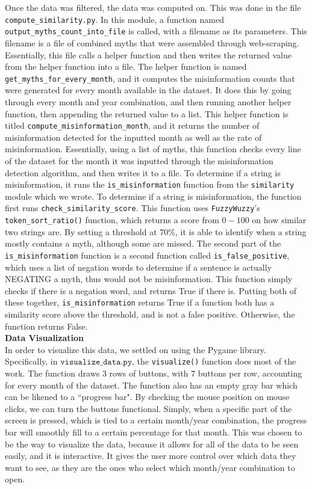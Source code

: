 \documentclass[fontsize=11pt]{article}
\begin{document}
    Once the data was filtered, the data was computed on. This was done in the file \texttt{compute\_similarity.py}. In this module, a function named \texttt{output\_myths\_count\_into\_file} is called, with a filename as its parameters. This filename is a file of combined myths that were assembled through web-scraping. Essentially, this file calls a helper function and then writes the returned value from the helper function into a file. The helper function is named \texttt{get\_myths\_for\_every\_month}, and it computes the misinformation counts that were generated for every month available in the dataset. It does this by going through every month and year combination, and then running another helper function, then appending the returned value to a list. This helper function is titled \texttt{compute\_misinformation\_month}, and it returns the number of misinformation detected for the inputted month as well as the rate of misinformation. Essentially, using a list of myths, this function checks every line of the dataset for the month it was inputted through the misinformation detection algorithm, and then writes it to a file. To determine if a string is misinformation, it runs the \texttt{is\_misinformation} function from the \texttt{similarity} module which we wrote. To determine if a string is misinformation, the function first runs \texttt{check\_similarity\_score}. This function uses \texttt{FuzzyWuzzy}'s \texttt{token\_sort\_ratio()} function, which returns a score from $0 - 100$ on how similar two strings are. By setting a threshold at $70\%$, it is able to identify when a string mostly contains a myth, although some are missed. The second part of the \texttt{is\_misinformation} function is a second function called \texttt{is\_false\_positive}, which uses a list of negation words to determine if a sentence is actually NEGATING a myth, thus would not be misinformation. This function simply checks if there is a negation word, and returns True if there is. Putting both of these together, \texttt{is\_misinformation} returns True if a function both has a similarity score above the threshold, and is not a false positive. Otherwise, the function returns False. \\
    \hfill\break
    \textbf{Data Visualization}\\
    In order to visualize this data, we settled on using the Pygame library. Specifically, in $\texttt{visualize\_data.py}$, the \texttt{visualize()} function does most of the work. The function draws 3 rows of buttons, with 7 buttons per row, accounting for every month of the dataset. The function also has an empty gray bar which can be likened to a ``progress bar". By checking the mouse position on mouse clicks, we can turn the buttons functional. Simply, when a specific part of the screen is pressed, which is tied to a certain month/year combination, the progress bar will smoothly fill to a certain percentage for that month. This was chosen to be the way to visualize the data, because it allows for all of the data to be seen easily, and it is interactive. It gives the user more control over which data they want to see, as they are the ones who select which month/year combination to open.
\end{document}
